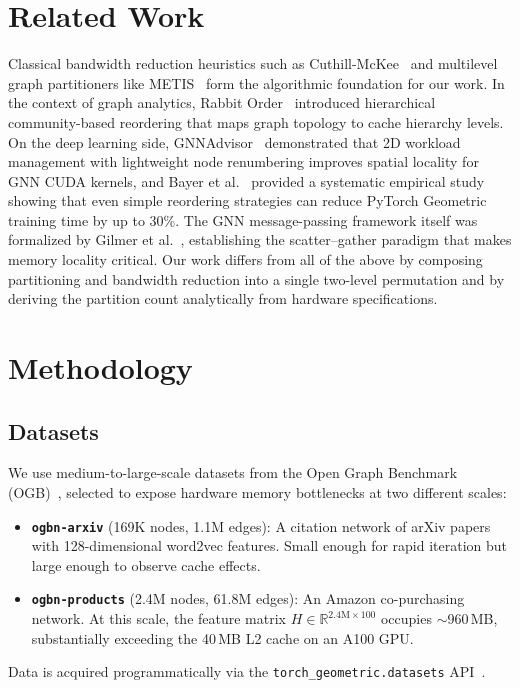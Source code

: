 \documentclass[sigconf,review]{acmart}
\begin{document}
\section{Related Work}

Classical bandwidth reduction heuristics such as Cuthill-McKee~\cite{cuthill1969bandwidth} and multilevel graph partitioners like METIS~\cite{karypis1998metis} form the algorithmic foundation for our work. In the context of graph analytics, Rabbit Order~\cite{arai2016rabbit} introduced hierarchical community-based reordering that maps graph topology to cache hierarchy levels. On the deep learning side, GNNAdvisor~\cite{wang2021gnnadvisor} demonstrated that 2D workload management with lightweight node renumbering improves spatial locality for GNN CUDA kernels, and Bayer et al.~\cite{bayer2024reordering} provided a systematic empirical study showing that even simple reordering strategies can reduce PyTorch Geometric training time by up to 30\%. The GNN message-passing framework itself was formalized by Gilmer et al.~\cite{gilmer2017mpnn}, establishing the scatter--gather paradigm that makes memory locality critical. Our work differs from all of the above by composing partitioning and bandwidth reduction into a single two-level permutation and by deriving the partition count analytically from hardware specifications.

\section{Methodology}
\label{sec:method}

\subsection{Datasets}
We use medium-to-large-scale datasets from the Open Graph Benchmark (OGB)~\cite{hu2020ogb}, selected to expose hardware memory bottlenecks at two different scales:

\begin{itemize}
    \item \textbf{\texttt{ogbn-arxiv}} (169K nodes, 1.1M edges): A citation network of arXiv papers with 128-dimensional word2vec features. Small enough for rapid iteration but large enough to observe cache effects.
    \item \textbf{\texttt{ogbn-products}} (2.4M nodes, 61.8M edges): An Amazon co-purchasing network. At this scale, the feature matrix $H \in \mathbb{R}^{2.4\text{M}\times 100}$ occupies $\sim$960\,MB, substantially exceeding the 40\,MB L2 cache on an A100 GPU.
\end{itemize}
Data is acquired programmatically via the \texttt{torch\_geometric.datasets} API~\cite{fey2019pyg}.
\end{document}
